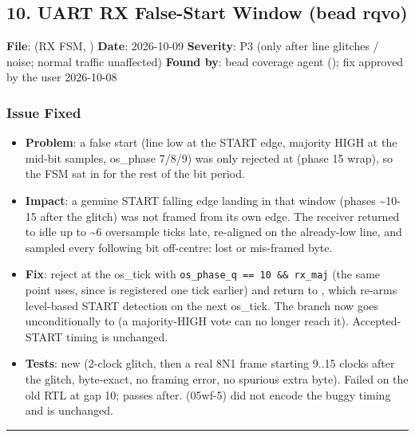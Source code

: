 \subsection{10. UART RX False-Start Window (bead rqvo)}\label{cr:fix:fixes-index:10-uart-rx-false-start-window-bead-rqvo}

\begin{record}

\textbf{File}:  (RX FSM,
) \textbf{Date}: 2026-10-09 \textbf{Severity}: P3 (only
after line glitches / noise; normal traffic unaffected) \textbf{Found
by}: bead  coverage agent (); fix approved by the user
2026-10-08

\end{record}

\subsubsection{Issue Fixed}\label{cr:fix:fixes-index:issue-fixed-3}

\begin{record}

\begin{itemize}
\tightlist
\item
  \textbf{Problem}: a false start (line low at the START edge, majority
  HIGH at the mid-bit samples, os\_phase 7/8/9) was only rejected at
   (phase 15 wrap), so the FSM sat in  for
  the rest of the bit period.
\item
  \textbf{Impact}: a genuine START falling edge landing in that window
  (phases \textasciitilde10-15 after the glitch) was not framed from its
  own edge. The receiver returned to idle up to \textasciitilde6
  oversample ticks late, re-aligned on the already-low line, and sampled
  every following bit off-centre: lost or mis-framed byte.
\item
  \textbf{Fix}: reject at the os\_tick with
  \texttt{os\_\allowbreak{}phase\_\allowbreak{}q\ =\allowbreak{}=\allowbreak{}\ 10\ \&\&\ rx\_\allowbreak{}maj}
  (the same point  uses, since  is
  registered one tick earlier) and return to , which
  re-arms level-based START detection on the next os\_tick. The
   branch now goes unconditionally to  (a
  majority-HIGH vote can no longer reach it). Accepted-START timing is
  unchanged.
\item
  \textbf{Tests}: new
   (2-clock glitch,
  then a real 8N1 frame starting 9..15 clocks after the glitch,
  byte-exact, no framing error, no spurious extra byte). Failed on the
  old RTL at gap 10; passes after. 
  (05wf-5) did not encode the buggy timing and is unchanged.
\end{itemize}

\begin{center}\rule{0.5\linewidth}{0.5pt}\end{center}

\end{record}

